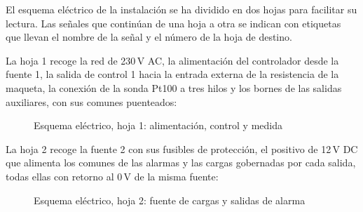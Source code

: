 
El esquema eléctrico de la instalación se ha dividido en dos hojas para facilitar su lectura. Las señales que continúan de una hoja a otra se indican con etiquetas que llevan el nombre de la señal y el número de la hoja de destino.

La hoja 1 recoge la red de 230\,V AC, la alimentación del controlador desde la fuente 1, la salida de control 1 hacia la entrada externa de la resistencia de la maqueta, la conexión de la sonda Pt100 a tres hilos y los bornes de las salidas auxiliares, con sus comunes puenteados:

\begin{figure}[H]
	\centering
	\caption{Esquema eléctrico, hoja 1: alimentación, control y medida}
\end{figure}

\clearpage
La hoja 2 recoge la fuente 2 con sus fusibles de protección, el positivo de 12\,V DC que alimenta los comunes de las alarmas y las cargas gobernadas por cada salida, todas ellas con retorno al 0\,V de la misma fuente:

\begin{figure}[H]
	\centering
	\caption{Esquema eléctrico, hoja 2: fuente de cargas y salidas de alarma}
\end{figure}
